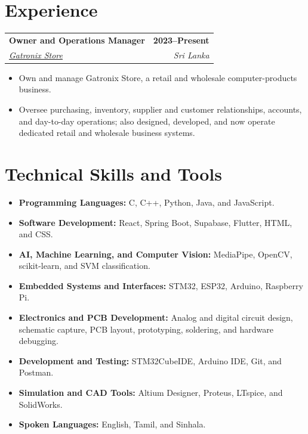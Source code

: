 \documentclass[a4paper,10pt]{article}
\makeatletter
\newcommand{\educationEntry}[4]{%
  \begin{tabularx}{\textwidth}{@{}Xr@{}}
    \textbf{#1} & \textbf{\small #2} \\
    \textit{#3} & \textit{\small #4}
  \end{tabularx}
}
\makeatother
\begin{document}
\vspace{1.1mm}

\section{Experience}

\educationEntry
  {Owner and Operations Manager}
  {2023--Present}
  {\href{https://maps.app.goo.gl/z9wBnqUMZs5da7UM9}{Gatronix Store \faMapMarker}}
  {Sri Lanka}

\begin{itemize}
  \item Own and manage Gatronix Store, a retail and wholesale computer-products business.
  \item Oversee purchasing, inventory, supplier and customer relationships, accounts, and day-to-day operations; also designed, developed, and now operate dedicated retail and wholesale business systems.
\end{itemize}

\section{Technical Skills and Tools}
\begin{itemize}[itemsep=0.8mm,topsep=0.45mm]
  \item \textbf{Programming Languages:} C, C++, Python, Java, and JavaScript.
  \item \textbf{Software Development:} React, Spring Boot, Supabase, Flutter, HTML, and CSS.
  \item \textbf{AI, Machine Learning, and Computer Vision:} MediaPipe, OpenCV, scikit-learn, and SVM classification.
  \item \textbf{Embedded Systems and Interfaces:} STM32, ESP32, Arduino, Raspberry Pi.
  \item \textbf{Electronics and PCB Development:} Analog and digital circuit design, schematic capture, PCB layout, prototyping, soldering, and hardware debugging.
  \item \textbf{Development and Testing:} STM32CubeIDE, Arduino IDE, Git, and Postman.
  \item \textbf{Simulation and CAD Tools:} Altium Designer, Proteus, LTspice, and SolidWorks.
  \item \textbf{Spoken Languages:} English, Tamil, and Sinhala.
\end{itemize}
\end{document}
